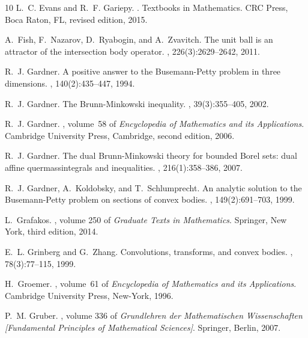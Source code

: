 \documentclass[11pt]{article}
\theoremstyle{definition}
\theoremstyle{proof}
\DeclareMathOperator{\+}{\mathop{\tilde{+}}}
\numberwithin{equation}{section}
\numberwithin{equation}{section}
\begin{document}
\begin{thebibliography}{10}
L.~C. Evans and R.~F. Gariepy.
.
\newblock Textbooks in Mathematics. CRC Press, Boca Raton, FL, revised edition,
  2015.

A.~Fish, F.~Nazarov, D.~Ryabogin, and A.~Zvavitch.
\newblock The unit ball is an attractor of the intersection body operator.
, 226(3):2629--2642, 2011.

R.~J. Gardner.
\newblock A positive answer to the {B}usemann-{P}etty problem in three
  dimensions.
, 140(2):435--447, 1994.

R.~J. Gardner.
\newblock The {B}runn-{M}inkowski inequality.
, 39(3):355--405, 2002.

R.~J. Gardner.
, volume~58 of {\em Encyclopedia of
  Mathematics and its Applications}.
\newblock Cambridge University Press, Cambridge, second edition, 2006.

R.~J. Gardner.
\newblock The dual {B}runn-{M}inkowski theory for bounded {B}orel sets: dual
  affine quermassintegrals and inequalities.
, 216(1):358--386, 2007.

R.~J. Gardner, A.~Koldobsky, and T.~Schlumprecht.
\newblock An analytic solution to the {B}usemann-{P}etty problem on sections of
  convex bodies.
, 149(2):691--703, 1999.

L.~Grafakos.
, volume 250 of {\em Graduate Texts in
  Mathematics}.
\newblock Springer, New York, third edition, 2014.

E.~L. Grinberg and G.~Zhang.
\newblock Convolutions, transforms, and convex bodies.
, 78(3):77--115, 1999.

H.~Groemer.
, volume~61 of {\em Encyclopedia of Mathematics and its
  Applications}.
\newblock Cambridge University Press, New-York, 1996.

P.~M. Gruber.
, volume 336 of {\em Grundlehren
  der Mathematischen Wissenschaften [Fundamental Principles of Mathematical
  Sciences]}.
\newblock Springer, Berlin, 2007.


\end{thebibliography}
\end{document}
